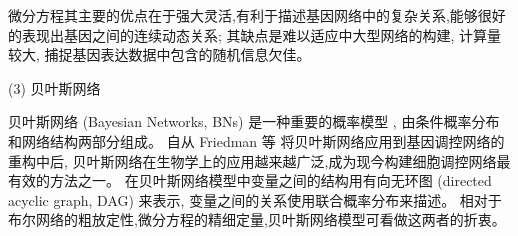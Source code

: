 微分方程其主要的优点在于强大灵活,有利于描述基因网络中的复杂关系,能够很好的表现出基因之间的连续动态关系;
其缺点是难以适应中大型网络的构建, 计算量较大, 捕捉基因表达数据中包含的随机信息欠佳。

(3) 贝叶斯网络

贝叶斯网络 (Bayesian Networks, BNs) 是一种重要的概率模型 ,
由条件概率分布和网络结构两部分组成。
自从 Friedman 等  将贝叶斯网络应用到基因调控网络的重构中后,
贝叶斯网络在生物学上的应用越来越广泛,成为现今构建细胞调控网络最有效的方法之一。
在贝叶斯网络模型中变量之间的结构用有向无环图 (directed acyclic graph, DAG) 来表示,
变量之间的关系使用联合概率分布来描述。
相对于布尔网络的粗放定性,微分方程的精细定量,贝叶斯网络模型可看做这两者的折衷。

